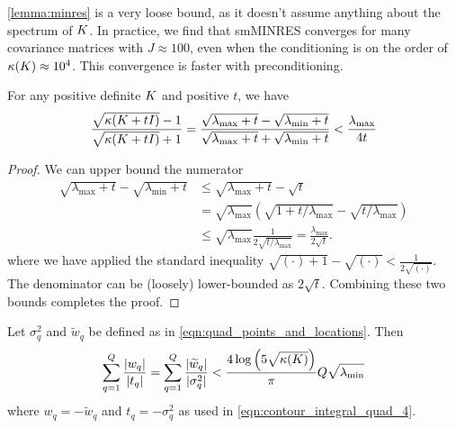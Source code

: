 \cref{lemma:minres} is a very loose bound, as it doesn't assume anything about the spectrum of $K$.
In practice, we find that smMINRES converges for many covariance matrices with $J \approx 100$, even when the conditioning is on the order of $\kappa(K) \approx 10^4$.
This convergence is faster with preconditioning.




\begin{lemma}
  For any positive definite $K$ and positive $t$, we have
  \begin{align}
    \frac{
      \sqrt{\kappa(K + t I)} - 1
    }{
      \sqrt{\kappa(K + t I)} + 1
    } = \frac{\sqrt{\lambda_\text{max} + t} - \sqrt{\lambda_\text{min} + t}  }{\sqrt{\lambda_\text{max} + t} + \sqrt{\lambda_\text{min} + t}  }
    < \frac{\lambda_\text{max}}{4t}
  \end{align}
  \label{lemma:condition}
\end{lemma}

\begin{proof}
  We can upper bound the numerator
  \begin{align*}
    \sqrt{\lambda_\text{max} + t} - \sqrt{\lambda_\text{min} + t}
    &\leq
    \sqrt{\lambda_\text{max} + t} - \sqrt{t}
    \\
    &=
    \sqrt{\lambda_\text{max}} \left( \sqrt{1 + t/\lambda_\text{max}} - \sqrt{t/\lambda_\text{max}} \right)
    \\
    &\leq
    \sqrt{\lambda_\text{max}} \frac{1}{2 \sqrt{t/\lambda_\text{max}}}
    =
    \frac{\lambda_\text{max}}{2 \sqrt{t}}.
  \end{align*}
  where we have applied the standard inequality $\sqrt{(\cdot)+1} - \sqrt{(\cdot)} < \frac{1}{2 \sqrt{(\cdot)}}$.
  The denominator can be (loosely) lower-bounded as $2\sqrt{t}$.
  Combining these two bounds completes the proof.
\end{proof}




\begin{lemma}
  Let $\sigma_q^2$ and $\widetilde w_q$ be defined as in \cref{eqn:quad_points_and_locations}.
  Then
  \begin{equation*}
    \sum_{q=1}^Q \frac{|w_q|}{|t_q|} = \sum_{q=1}^Q \frac{|\widetilde w_q|}{|\sigma^2_q|} < \frac{4  \log \left( 5 \sqrt{\kappa(K)} \right)  }{\pi}Q\sqrt{\lambda_\text{min}} \\
  \end{equation*}
  where $w_q = -\widetilde w_q$ and $t_q = -\sigma^2_q$ as used in \cref{eqn:contour_integral_quad_4}.
  \label{lemma:quad_ratio}
\end{lemma}

